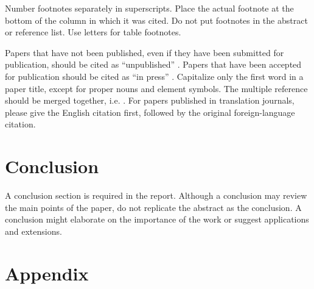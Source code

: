 \documentclass[a4paper, 10pt, conference]{ieeeconf}      %
\begin{document}
Number footnotes separately in superscripts. Place the actual footnote at 
the bottom of the column in which it was cited. Do not put footnotes in the 
abstract or reference list. Use letters for table footnotes.

 Papers that have not been published, even if they have been 
submitted for publication, should be cited as ``unpublished'' \cite{biagettiDiscreteBesselFunctions2016}. Papers 
that have been accepted for publication should be cited as ``in press'' \cite{VW8000Std}. 
Capitalize only the first word in a paper title, except for proper nouns and 
element symbols.  The multiple reference should be merged together, i.e. \cite{schitterDesignModelingHighSpeed2007,oppenheimSignalsSystems2nd1996,MunnigSchmidtMechatronics2nd2014}.
For papers published in translation journals, please give the English 
citation first, followed by the original foreign-language citation.


\section{Conclusion}

A conclusion section is required in the report. Although a conclusion may review the main points of the paper, do not replicate the abstract as the conclusion. A conclusion might elaborate on the importance of the work or suggest applications and extensions. 

\addtolength{\textheight}{-12cm}   %







\section*{Appendix}
\end{document}
